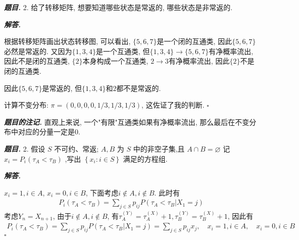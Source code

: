 \documentclass[10pt, a4paper, oneside]{ctexart}
\newenvironment{problem}{\begin{framed}\par\noindent\textbf{\textit{题目. }}}{\end{framed}\par}
\newenvironment{solution}{%
  \par\noindent\textbf{\textit{解答. }}\ignorespaces
}{%
  \hfill\ensuremath{\square}\par %
}
\newenvironment{note}{\par\noindent\textbf{\textit{题目的注记. }}\ignorespaces}{\par}
\begin{document}
    \begin{problem}
        2. 给了转移矩阵, 想要知道哪些状态是常返的, 哪些状态是非常返的.
    \end{problem}
    \begin{solution}
    根据转移矩阵画出状态转移图, 可以看出, $\{5,6,7\}$是一个闭的互通类, 因此$\{5,6,7\}$必然是常返的. 又因为$\{1,3,4\}$是一个互通类, 但$\{1,3,4\}\to \{5,6,7\}$有净概率流出, 因此不是闭的互通类, $\{2\}$本身构成一个互通类, $2\to 3$有净概率流出, 因此$\{2\}$不是闭的互通类.
    
    因此$\{5,6,7\}$是常返的, 但$\{1,3,4\}$和$2$都不是常返的.
    
    计算不变分布: $\pi=(0,0,0,0,1/3,1/3,1/3)$, 这佐证了我的判断.
    \end{solution}
    \begin{note}
        直观上来说, 一个"有限"互通类如果有净概率流出, 那么最后在不变分布中对应的分量一定是$0$.
    \end{note}

    \begin{problem}
        2. 假设 \( S \) 不可约、常返; \( A,B \) 为 \( S \) 中的非空子集,且 \( A \cap  B = \varnothing  \) 记 \( {x}_{i} = {P}_{i}\left( {{\tau }_{A} < {\tau }_{B}}\right)  \) ,写出 \( \left\{  {{x}_{i} : i \in  S}\right\}   \) 满足的方程组.
    \end{problem}
    \begin{solution}
        $x_i=1,i\in A$, $x_i=0,i\in B$, 下面考虑$i\notin A, i\notin B$. 此时有
        \begin{align*}
            P_i(\tau_A<\tau_B)=\sum_{j\in S}p_{ij}P(\tau_A<\tau_B|X_1=j)
        \end{align*}
        考虑$Y_n=X_{n+1}$, 由于$i\notin A, i\notin B$, 有$\tau_A^{(Y)}=\tau_A^{(X)}+1, \tau_B^{(Y)}=\tau_B^{(X)}+1$, 因此有
        \begin{align*}
            P_i(\tau_A<\tau_B)=\sum_{j\in S}p_{ij}P(\tau_A<\tau_B|X_1=j)=\sum_{j\in S}p_{ij}x_j,\quad x_i=1,i\in A,\quad x_i=0,i\in B
        \end{align*}
    \end{solution}
    
\end{document}
